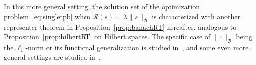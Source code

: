 \documentclass[12pt]{article}
\begin{document}
    In this more general setting, the solution set of the optimization problem~\eqref{eq:singletpb} when $\mathcal{R}(s) = \lambda \| s \|_{\mathcal{B}}$ is characterized with another representer theorem in Proposition~\ref{prop:banachRT} hereafter, analogous to Proposition~\ref{prop:hilbertRT} on Hilbert spaces.
    The specific case of $\lVert \cdot \rVert_\mathcal{B}$ being the $\ell_1$-norm or its functional generalization is studied in~\cite{Fisher1975,Unser2016representer,unser2017splines,bredies2020sparsity}, and some even more general settings are studied in~\cite{boyer2019representer,unser2019native}.


    
\end{document}
